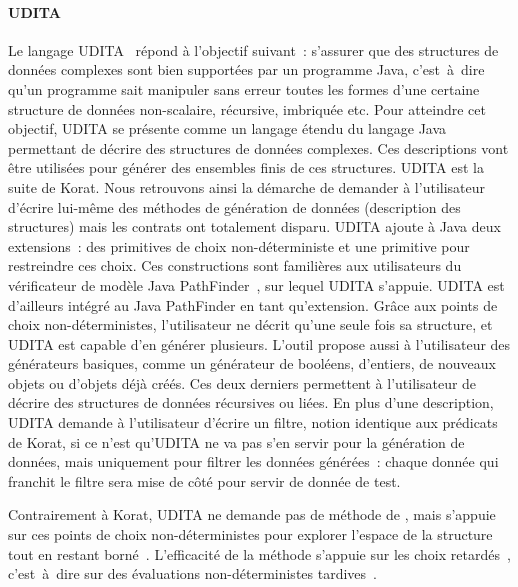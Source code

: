 \paragraph{UDITA} Le langage UDITA~ répond à l'objectif
suivant~: s'assurer que des structures de données complexes sont bien supportées
par un programme Java, c'est~à~dire qu'un programme sait manipuler sans erreur
toutes les formes d'une certaine structure de données non-scalaire, récursive,
imbriquée etc. Pour atteindre cet objectif, UDITA se présente comme un langage
étendu du langage Java permettant de décrire des structures de données
complexes. Ces descriptions vont être utilisées pour générer des ensembles finis
de ces structures. UDITA est la suite de Korat. Nous retrouvons ainsi la
démarche de demander à l'utilisateur d'écrire lui-même des méthodes de
génération de données (description des structures) mais les contrats ont
totalement disparu. UDITA ajoute à Java deux extensions~: des primitives de
choix non-déterministe et une primitive pour restreindre ces choix. Ces
constructions sont familières aux utilisateurs du vérificateur de modèle Java
PathFinder~, sur lequel UDITA s'appuie. UDITA est d'ailleurs
intégré au  Java PathFinder en tant qu'extension. Grâce aux
points de choix non-déterministes, l'utilisateur ne décrit qu'une seule fois sa
structure, et UDITA est capable d'en générer plusieurs. L'outil propose aussi à
l'utilisateur des générateurs basiques, comme un générateur de booléens,
d'entiers, de nouveaux objets ou d'objets déjà créés.  Ces deux derniers
permettent à l'utilisateur de décrire des structures de données récursives ou
liées. En plus d'une description, UDITA demande à l'utilisateur d'écrire un
filtre, notion identique aux prédicats de Korat, si ce n'est qu'UDITA ne va pas
s'en servir pour la génération de données, mais uniquement pour filtrer les
données générées~: chaque donnée qui franchit le filtre sera mise de côté pour
servir de donnée de test.

Contrairement à Korat, UDITA ne demande pas de méthode de
, mais s'appuie sur ces points de choix
non-déterministes pour explorer l'espace de la structure tout en restant
borné~. L'efficacité de la méthode s'appuie
sur les choix retardés~, c'est~à~dire sur des évaluations
non-déterministes tardives~.

